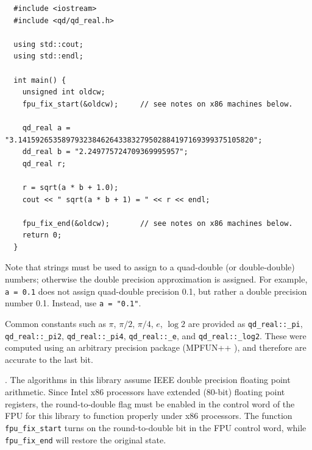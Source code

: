 \documentclass[11pt]{article}
\theoremstyle{definition}
\begin{document}
\begin{minipage}{0.8\textwidth}
\begin{tt}\begin{verbatim}
  #include <iostream>
  #include <qd/qd_real.h>

  using std::cout;
  using std::endl;

  int main() {
    unsigned int oldcw;
    fpu_fix_start(&oldcw);     // see notes on x86 machines below.

    qd_real a = "3.141592653589793238462643383279502884197169399375105820";
    dd_real b = "2.249775724709369995957";
    qd_real r;
    
    r = sqrt(a * b + 1.0);
    cout << " sqrt(a * b + 1) = " << r << endl;

    fpu_fix_end(&oldcw);       // see notes on x86 machines below.
    return 0;
  }
\end{verbatim}\end{tt}
\end{minipage}

\bigskip

Note that strings must be used to assign to a quad-double (or double-double)
numbers; otherwise the double precision approximation is assigned.
For example, {\tt a = 0.1} does not assign quad-double precision 0.1, 
but rather a double precision number 0.1.  Instead, use {\tt a = "0.1"}.

Common constants such as $\pi$, $\pi/2$, $\pi/4$, $e$, $\log 2$ are
 provided as {\tt qd\_real::\_pi}, {\tt qd\_real::\_pi2}, 
{\tt qd\_real::\_pi4}, {\tt qd\_real::\_e}, and {\tt qd\_real::\_log2}.
These were computed using an arbitrary precision package (MPFUN++ 
\cite{cha98}), and therefore are accurate to the last bit.

.
The algorithms in this library assume IEEE double precision floating
point arithmetic.  Since Intel x86 processors have extended (80-bit)
floating point registers, the round-to-double flag must be enabled in
the control word of the FPU for this library to function properly
under x86 processors.  The function {\tt fpu\_fix\_start} turns
on the round-to-double bit in the FPU control word, while 
{\tt fpu\_fix\_end} will restore the original state.
\end{document}
